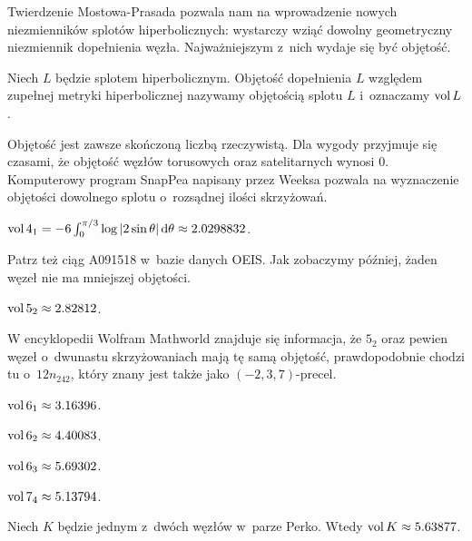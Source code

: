 Twierdzenie Mostowa-Prasada pozwala nam na wprowadzenie nowych niezmienników splotów hiperbolicznych: wystarczy wziąć dowolny geometryczny niezmiennik dopełnienia węzła.
Najważniejszym z~nich wydaje się być objętość.

\begin{definition}[objętość]
    Niech $L$ będzie splotem hiperbolicznym.
    Objętość dopełnienia $L$ względem zupełnej metryki hiperbolicznej nazywamy objętością splotu $L$ i~oznaczamy $\operatorname{vol} L$.
\end{definition}

Objętość jest zawsze skończoną liczbą rzeczywistą.
Dla wygody przyjmuje się czasami, że objętość węzłów torusowych oraz satelitarnych wynosi $0$.
Komputerowy program SnapPea napisany przez Weeksa pozwala na wyznaczenie objętości dowolnego splotu o~rozsądnej ilości skrzyżowań.

\begin{example}
    $\operatorname{vol} 4_1 = -6 \int_{0}^{\pi/3} \log |2\sin \theta| \,\mathrm{d}\theta \approx 2.0298832$.
\end{example}

Patrz też ciąg A091518 w~bazie danych OEIS.
Jak zobaczymy później, żaden węzeł nie ma mniejszej objętości.

\begin{example}
    $\operatorname{vol} 5_2 \approx 2.82812$.
\end{example}

W encyklopedii Wolfram Mathworld znajduje się informacja, że $5_2$ oraz pewien węzeł o~dwunastu skrzyżowaniach mają tę samą objętość, prawdopodobnie chodzi tu o~$12n_{242}$, który znany jest także jako $(-2, 3, 7)$-precel. 

\begin{example}
    $\operatorname{vol} 6_1 \approx 3.16396$.
\end{example}

\begin{example}
    $\operatorname{vol} 6_2 \approx 4.40083$.
\end{example}

\begin{example}
    $\operatorname{vol} 6_3 \approx 5.69302$.
\end{example}

\begin{example}
    $\operatorname{vol} 7_4 \approx 5.13794$.
\end{example}

\begin{example}
    Niech $K$ będzie jednym z~dwóch węzłów w~parze Perko.
    Wtedy $\operatorname{vol} K \approx 5.63877$.
\end{example}

